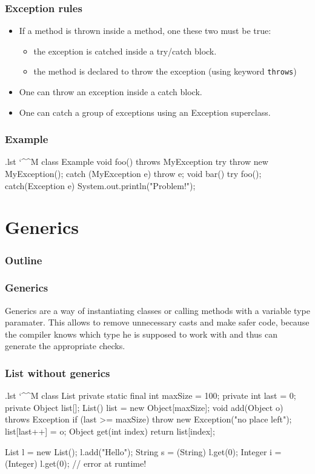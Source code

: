 \documentclass[10pt,handout]{beamer}
\makeatletter
\newenvironment{code}{%
  \begingroup
  \@bsphack
  \immediate\openout\lstvrb@out\jobname.lst
  \let\do\@makeother\dospecials\catcode`\^^M\active
  \def\verbatim@processline{%
    \immediate\write\lstvrb@out{\the\verbatim@line}}%
  \verbatim@start}{%
  \immediate\closeout\lstvrb@out
  \@esphack
  \endgroup
  
  \begin{alertblock}{}
    
  \end{alertblock}}
\makeatother
\begin{document}
\begin{frame}[fragile]
\frametitle{Exception rules}
\begin{itemize}
  \item If a method is thrown inside a method, one these two must be true:
  \begin{itemize}
    \item the exception is catched inside a try/catch block.
    \item the method is declared to throw the exception (using keyword \verb!throws!)
  \end{itemize}
  \item One can throw an exception inside a catch block.
  \item One can catch a group of exceptions using an Exception superclass.
\end{itemize}
\end{frame}

\begin{frame}[fragile]
\frametitle{Example}
\begin{code}
  class Example {
    void foo() throws MyException {
      try {
        throw new MyException();
      } catch (MyException e) {
        throw e;
      }
    }
    void bar() {
      try {
        foo();
      } catch(Exception e) {
        System.out.println("Problem!");
      }
    }
  }
\end{code}
\end{frame}

\section{Generics}
\begin{frame}
  \frametitle{Outline}
  \tableofcontents
\end{frame}

\begin{frame}[fragile]
\frametitle{Generics}
\begin{definition}
Generics are a way of instantiating classes or calling methods with a variable type paramater.
This allows to remove unnecessary casts and make safer code, because the compiler knows which type he
is supposed to work with and thus can generate the appropriate checks.
\end{definition}
\end{frame}

\begin{frame}
\frametitle{List without generics}
\begin{code}
  class List {
    private static final int maxSize = 100;
    private int last = 0;
    private Object list[];
    List() {
      list = new Object[maxSize];
    }
    void add(Object o) throws Exception{
      if (last >= maxSize) 
        throw new Exception("no place left");
      list[last++] = o;
    }
    Object get(int index) {
      return list[index];
    }
  }

  List l = new List();
  l.add("Hello");
  String s = (String) l.get(0);
  Integer i = (Integer) l.get(0); // error at runtime!
\end{code}
\end{frame}
\end{document}

